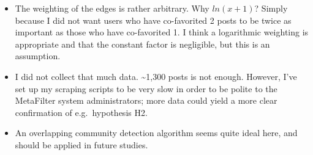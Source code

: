 \begin{itemize}
\item
  The weighting of the edges is rather arbitrary. Why $ln(x+1)$? Simply
  because I did not want users who have co-favorited 2 posts to be twice
  as important as those who have co-favorited 1. I think a logarithmic
  weighting is appropriate and that the constant factor is negligible,
  but this is an assumption.
\item
  I did not collect that much data. \textasciitilde{}1,300 posts is not
  enough. However, I've set up my scraping scripts to be very slow in
  order to be polite to the MetaFilter system administrators; more data
  could yield a more clear confirmation of e.g.~hypothesis H2.
\item
  An overlapping community detection algorithm seems quite ideal here,
  and should be applied in future studies.
\end{itemize}
